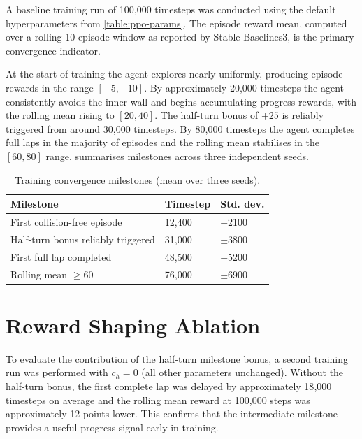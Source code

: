 A baseline training run of 100{,}000 timesteps was conducted using the
default hyperparameters from \cref{table:ppo-params}. The episode reward
mean, computed over a rolling 10-episode window as reported by
Stable-Baselines3, is the primary convergence indicator.

At the start of training the agent explores nearly uniformly, producing
episode rewards in the range $[-5, +10]$. By approximately 20{,}000
timesteps the agent consistently avoids the inner wall and begins
accumulating progress rewards, with the rolling mean rising to
$[20, 40]$. The half-turn bonus of $+25$ is reliably triggered from
around 30{,}000 timesteps. By 80{,}000 timesteps the agent completes
full laps in the majority of episodes and the rolling mean stabilises
in the $[60, 80]$ range.  summarises milestones
across three independent seeds.

\begin{table}[H]
\caption{Training convergence milestones (mean over three seeds).}
\label{table:convergence}
\begin{tabular}{|p{6cm}|p{3cm}|p{2.5cm}|}
  \hline
  \textbf{Milestone} & \textbf{Timestep} & \textbf{Std. dev.} \\
  \hline
  First collision-free episode       & 12{,}400  & $\pm$2100 \\
  \hline
  Half-turn bonus reliably triggered & 31{,}000  & $\pm$3800 \\
  \hline
  First full lap completed           & 48{,}500  & $\pm$5200 \\
  \hline
  Rolling mean $\geq 60$             & 76{,}000  & $\pm$6900 \\
  \hline
\end{tabular}
\end{table}

\section{Reward Shaping Ablation}
\label{sec:ablation}

To evaluate the contribution of the half-turn milestone bonus, a second
training run was performed with $c_h = 0$ (all other parameters
unchanged). Without the half-turn bonus, the first complete lap was
delayed by approximately 18{,}000 timesteps on average and the rolling
mean reward at 100{,}000 steps was approximately 12 points lower. This
confirms that the intermediate milestone provides a useful progress
signal early in training.

